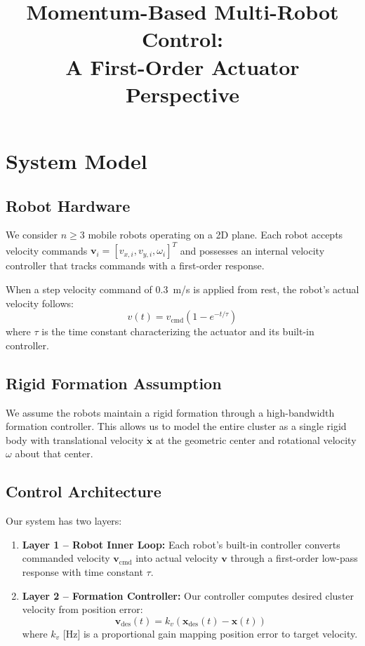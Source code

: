 \documentclass[11pt]{article}
\title{Momentum-Based Multi-Robot Control:\\A First-Order Actuator Perspective}
\author{}
\date{}
\begin{document}
\maketitle

\section{System Model}

\subsection{Robot Hardware}
We consider $n \geq 3$ mobile robots operating on a 2D plane. Each robot accepts velocity commands $\mathbf{v}_i = [v_{x,i}, v_{y,i}, \omega_i]^T$ and possesses an internal velocity controller that tracks commands with a first-order response. 

When a step velocity command of 0.3~m/s is applied from rest, the robot's actual velocity follows:
\begin{equation}
v(t) = v_{\text{cmd}}(1 - e^{-t/\tau})
\end{equation}
where $\tau$ is the time constant characterizing the actuator and its built-in controller.

\subsection{Rigid Formation Assumption}
We assume the robots maintain a rigid formation through a high-bandwidth formation controller. This allows us to model the entire cluster as a single rigid body with translational velocity $\dot{\mathbf{x}}$ at the geometric center and rotational velocity $\omega$ about that center.

\subsection{Control Architecture}
Our system has two layers:
\begin{enumerate}
    \item \textbf{Layer 1 -- Robot Inner Loop:} Each robot's built-in controller converts commanded velocity $\mathbf{v}_{\text{cmd}}$ into actual velocity $\mathbf{v}$ through a first-order low-pass response with time constant $\tau$.
    
    \item \textbf{Layer 2 -- Formation Controller:} Our controller computes desired cluster velocity from position error:
    \begin{equation}
    \mathbf{v}_{\text{des}}(t) = k_v(\mathbf{x}_{\text{des}}(t) - \mathbf{x}(t))
    \end{equation}
    where $k_v$ [Hz] is a proportional gain mapping position error to target velocity.
\end{enumerate}
\end{document}
